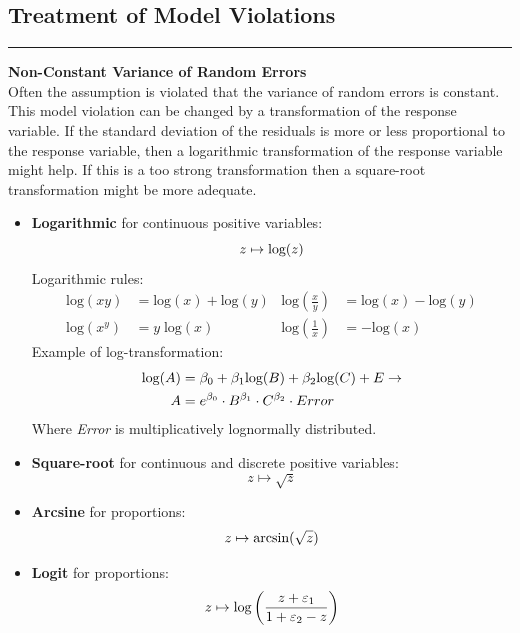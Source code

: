 \subsection{Treatment of Model Violations}
\noindent\rule[\linienAbstand]{\linewidth}{\linienDicke}

\textbf{Non-Constant Variance of Random Errors}\\
Often the assumption is violated that the variance of random errors is constant.\\
This model violation can be changed by a transformation of the response variable. If the standard deviation of the residuals is more or less proportional to the response variable, then a logarithmic transformation of the response variable might help. If this is a too strong transformation then a square-root transformation might be more adequate.
\begin{itemize}
  \item \textbf{Logarithmic} for continuous positive variables:
  \begin{equation}
    z \mapsto \textup{log}(z)
  \end{equation}
  Logarithmic rules:
  \begin{align*}
    \text{log}(xy) &= \text{log}(x) + \text{log}(y) &
    \text{log}\left(\frac{x}{y}\right) &= \text{log}(x) - \text{log}(y) \\
    \text{log}\left(x^y\right) &= y\;\text{log}(x) &
    \text{log}\left(\frac{1}{x}\right) &= - \text{log}(x)
  \end{align*}
  Example of log-transformation:
  \begin{equation}
    \begin{split}
      \textup{log}(A) &= \beta_0 + \beta_1 \textup{log}(B) + \beta_2 \textup{log}(C) + E \rightarrow \\
      A &= e^{\beta_0} \cdot B^{\beta_1} \cdot C^{\beta_2} \cdot Error
    \end{split}
  \end{equation}
  Where \emph{Error} is multiplicatively lognormally distributed.

  \item \textbf{Square-root} for continuous and discrete positive variables:
  \begin{equation}
    z \mapsto \sqrt{z}
  \end{equation}
  \item \textbf{Arcsine} for proportions:
  \begin{equation}
    z \mapsto \textup{arcsin}(\sqrt{z})
  \end{equation}
  \item \textbf{Logit} for proportions:
  \begin{equation}
    z \mapsto \textup{log}\left(\frac{z + \varepsilon_1}{1 + \varepsilon_2 - z} \right)
  \end{equation}
\end{itemize}

